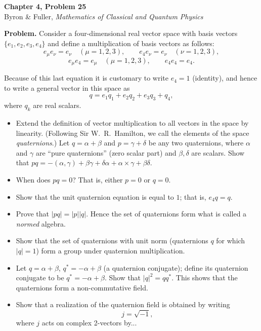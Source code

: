 \documentclass[12pt]{article}
\begin{document}
\begin{center}
{\Large\bfseries Chapter 4, Problem 25}\\[6pt]
Byron \& Fuller, \textit{Mathematics of Classical and Quantum Physics}
\end{center}

\bigskip

\textbf{Problem.} Consider a four-dimensional real vector space with basis vectors $\{e_1, e_2, e_3, e_4\}$ and define a multiplication of basis vectors as follows:
\[
e_\mu e_\nu = e_\nu \quad (\mu = 1, 2, 3), \qquad e_4 e_\nu = e_\nu \quad (\nu = 1, 2, 3),
\]
\[
e_\mu e_4 = e_\mu \quad (\mu = 1, 2, 3), \qquad e_4 e_4 = e_4.
\]

Because of this last equation it is customary to write $e_4 = 1$ (identity), and hence to write a general vector in this space as
\[
q = e_1 q_1 + e_2 q_2 + e_3 q_3 + q_4,
\]
where $q_k$ are real scalars.

\begin{itemize}
\item[(a)] Extend the definition of vector multiplication to all vectors in the space by linearity. (Following Sir W.\ R.\ Hamilton, we call the elements of the space \textit{quaternions}.) Let $q = \alpha + \beta$ and $p = \gamma + \delta$ be any two quaternions, where $\alpha$ and $\gamma$ are ``pure quaternions'' (zero scalar part) and $\beta, \delta$ are scalars.
Show that $pq = -(\alpha,\gamma) + \beta\gamma + \delta\alpha + \alpha \times \gamma + \beta\delta$.
\item[(b)] When does $pq = 0$? That is, either $p = 0$ or $q = 0$.
\item[(c)] Show that the unit quaternion equation is equal to $1$; that is, $e_4 q = q$.
\item[(d)] Prove that $|pq| = |p||q|$. Hence the set of quaternions form what is called a \textit{normed} algebra.
\item[(e)] Show that the set of quaternions with unit norm (quaternions $q$ for which $|q| = 1$) form a group under quaternion multiplication.
\item[(f)] Let $q = \alpha + \beta$, $q^* = -\alpha + \beta$ (a quaternion conjugate); define its quaternion conjugate to be $q^* = -\alpha + \beta$. Show that $|q|^2 = qq^*$. This shows that the quaternions form a non-commutative field.
\item[(g)] Show that a realization of the quaternion field is obtained by writing
\[
j = \sqrt{-1},
\]
where $j$ acts on complex 2-vectors by...
\end{itemize}
\end{document}
